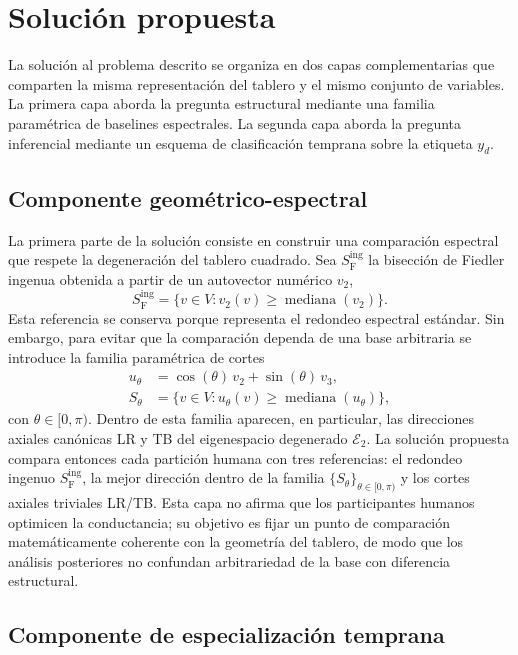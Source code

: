 \documentclass[journal]{IEEEtran}
\newcommand{\Sing}{S^{\mathrm{ing}}_{\mathrm{F}}}
\newcommand{\Etwo}{\mathcal{E}_2}
\begin{document}
\section{Solución propuesta}

La solución al problema descrito se organiza en dos capas complementarias que comparten la misma representación del tablero y el mismo conjunto de variables. La primera capa aborda la pregunta estructural mediante una familia paramétrica de baselines espectrales. La segunda capa aborda la pregunta inferencial mediante un esquema de clasificación temprana sobre la etiqueta $y_d$.

\subsection{Componente geométrico-espectral}

La primera parte de la solución consiste en construir una comparación espectral que respete la degeneración del tablero cuadrado. Sea $\Sing$ la bisección de Fiedler ingenua obtenida a partir de un autovector numérico $v_2$,
\begin{equation}
\Sing = \bigl\{v \in V : v_2(v) \ge \operatorname{mediana}(v_2) \bigr\}.
\label{eq:naive}
\end{equation}
Esta referencia se conserva porque representa el redondeo espectral estándar. Sin embargo, para evitar que la comparación dependa de una base arbitraria se introduce la familia paramétrica de cortes
\begin{align}
u_\theta &= \cos(\theta)\,v_2 + \sin(\theta)\,v_3, \label{eq:utheta}\\
S_\theta &= \bigl\{v \in V : u_\theta(v) \ge \operatorname{mediana}(u_\theta) \bigr\},
\end{align}
con $\theta \in [0,\pi)$. Dentro de esta familia aparecen, en particular, las direcciones axiales canónicas LR y TB del eigenespacio degenerado $\Etwo$. La solución propuesta compara entonces cada partición humana con tres referencias: el redondeo ingenuo $\Sing$, la mejor dirección dentro de la familia $\{S_\theta\}_{\theta \in [0,\pi)}$ y los cortes axiales triviales LR/TB. Esta capa no afirma que los participantes humanos optimicen la conductancia; su objetivo es fijar un punto de comparación matemáticamente coherente con la geometría del tablero, de modo que los análisis posteriores no confundan arbitrariedad de la base con diferencia estructural.

\subsection{Componente de especialización temprana}
\end{document}
